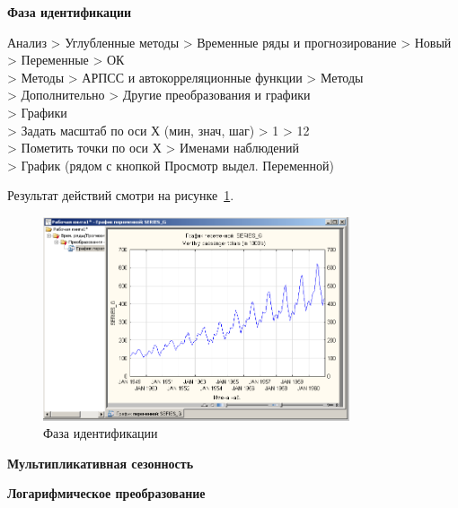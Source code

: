 \begin{center}
  \textbf{Фаза идентификации}
\end{center}

Анализ > Углубленные методы > Временные ряды и прогнозирование > Новый\\
> Переменные > ОК\\
> Методы > АРПСС и автокорреляционные функции > Методы \\
> Дополнительно > Другие преобразования и графики\\
> Графики\\
> Задать масштаб по оси Х (мин, знач, шаг) > 1 > 12\\
> Пометить точки по оси Х > Именами наблюдений\\
> График (рядом с кнопкой Просмотр выдел. Переменной)

Результат действий смотри на рисунке~\ref{fig:3}.

\begin{figure}[!h]
  \centering

  \includegraphics[height=6cm]
  {inc/Series_G/3.PNG}

  \caption{Фаза идентификации}

  \label{fig:3}
\end{figure}

\begin{center}
  \textbf{Мультипликативная сезонность}
\end{center}


\begin{center}
  \textbf{Логарифмическое преобразование}
\end{center}

